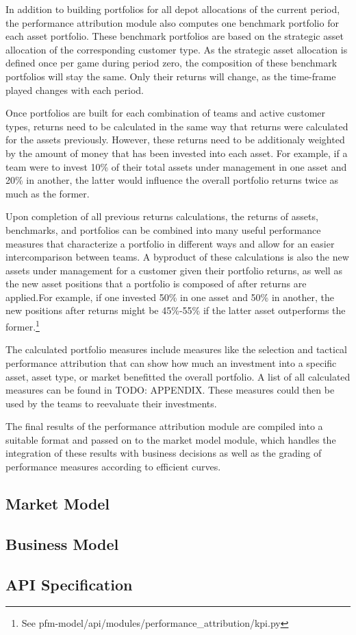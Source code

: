 In addition to building portfolios for all depot allocations of the current period, the performance attribution module also computes one benchmark portfolio for each asset portfolio. These benchmark portfolios are based on the strategic asset allocation of the corresponding customer type. As the strategic asset allocation is defined once per game during period zero, the composition of these benchmark portfolios will stay the same. Only their returns will change, as the time-frame played changes with each period.

Once portfolios are built for each combination of teams and active customer types, returns need to be calculated in the same way that returns were calculated for the assets previously. However, these returns need to be additionaly weighted by the amount of money that has been invested into each asset. For example, if a team were to invest 10\% of their total assets under management in one asset and 20\% in another, the latter would influence the overall portfolio returns twice as much as the former.

Upon completion of all previous returns calculations, the returns of assets, benchmarks, and portfolios can be combined into many useful performance measures that characterize a portfolio in different ways and allow for an easier intercomparison between teams. A byproduct of these calculations is also the new assets under management for a customer given their portfolio returns, as well as the new asset positions that a portfolio is composed of after returns are applied.For example, if one invested 50\% in one asset and 50\% in another, the new positions after returns might be 45\%-55\% if the latter asset outperforms the former.\footnote{See pfm-model/api/modules/performance\_attribution/kpi.py}

The calculated portfolio measures include measures like the selection and tactical performance attribution that can show how much an investment into a specific asset, asset type, or market benefitted the overall portfolio. A list of all calculated measures can be found in TODO: APPENDIX. These measures could then be used by the teams to reevaluate their investments.

The final results of the performance attribution module are compiled into a suitable format and passed on to the market model module, which handles the integration of these results with business decisions as well as the grading of performance measures according to efficient curves.


\subsection{Market Model}



\subsection{Business Model}



\subsection{API Specification}
